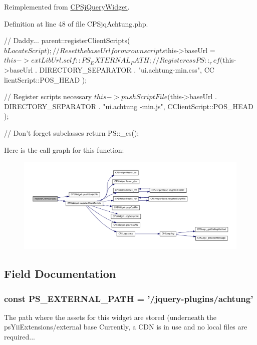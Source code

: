Reimplemented from \hyperlink{classCPSjQueryWidget_a79bf828ed852174a56c4db5ef918a83c}{CPSjQueryWidget}.



Definition at line 48 of file CPSjqAchtung.php.




\begin{DoxyCode}
    {
        //  Daddy...
        parent::registerClientScripts( $bLocateScript );
        
        //  Reset the baseUrl for our own scripts
        $this->baseUrl = $this->extLibUrl . self::PS_EXTERNAL_PATH;
        
        //  Register css
        PS::_rcf( $this->baseUrl . DIRECTORY_SEPARATOR . "ui.achtung-min.css", CC
      lientScript::POS_HEAD );
        
        //  Register scripts necessary
        $this->pushScriptFile( $this->baseUrl . DIRECTORY_SEPARATOR . "ui.achtung
      -min.js", CClientScript::POS_HEAD );

        //  Don't forget subclasses
        return PS::_cs();
    }
\end{DoxyCode}




Here is the call graph for this function:\nopagebreak
\begin{figure}[H]
\begin{center}
\leavevmode
\includegraphics[width=400pt]{classCPSjqAchtung_ac02a66bde8e72e4909137bf748edf665_cgraph}
\end{center}
\end{figure}




\subsection{Field Documentation}
\hypertarget{classCPSjqAchtung_a8ccb5e1d65c091f944a6aa8c5be834ca}{
\subsubsection[{PS\_\-EXTERNAL\_\-PATH}]{\setlength{\rightskip}{0pt plus 5cm}const {\bf PS\_\-EXTERNAL\_\-PATH} = '/jquery-\/plugins/achtung'}}
\label{classCPSjqAchtung_a8ccb5e1d65c091f944a6aa8c5be834ca}
The path where the assets for this widget are stored (underneath the psYiiExtensions/external base Currently, a CDN is in use and no local files are required... 

